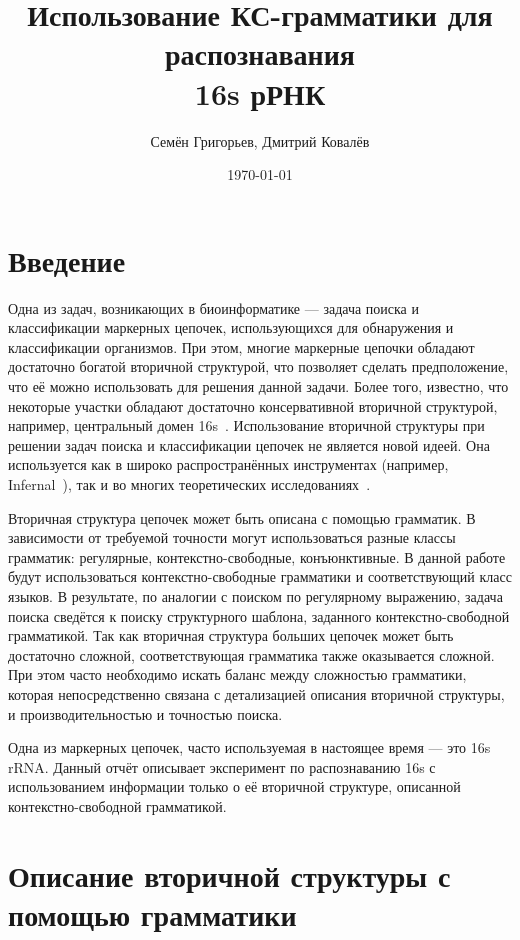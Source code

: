 \documentclass[12pt]{article}  %
\title{Использование КС-грамматики для распознавания \\ 16s рРНК}
\author{Семён Григорьев, Дмитрий Ковалёв}
\date{\today}
\theoremstyle{remark}
\begin{document}

\maketitle 

\section{Введение}

Одна из задач, возникающих в биоинформатике --- задача поиска и классификации маркерных цепочек, использующихся для обнаружения и классификации организмов.
При этом, многие маркерные цепочки обладают достаточно богатой вторичной структурой, что позволяет сделать предположение, что её можно использовать для решения данной задачи.
Более того, известно, что некоторые участки обладают достаточно консервативной вторичной структурой, например, центральный домен 16s~\cite{cons16s}.
Использование вторичной структуры при решении задач поиска и классификации цепочек не является новой идеей.
Она используется как в широко распространённых инструментах (например, Infernal~\cite{Infernal}), так и во многих теоретических исследованиях~\cite{SCFGRNA1,SCFGRNA2, STEMSEARCH1, STEMSEARCH2, SCFGHARD1}.

Вторичная структура цепочек может быть описана с помощью грамматик. 
В зависимости от требуемой точности могут использоваться разные классы грамматик: регулярные, контекстно-свободные, конъюнктивные.
В данной работе будут использоваться контекстно-свободные грамматики и соответствующий класс языков.
В результате, по аналогии с поиском по регулярному выражению, задача поиска сведётся к поиску структурного шаблона, заданного контекстно-свободной грамматикой.
Так как вторичная структура больших цепочек может быть достаточно сложной, соответствующая грамматика также оказывается сложной.
При этом часто необходимо искать баланс между сложностью грамматики, которая непосредственно связана с детализацией описания вторичной структуры, и производительностью и точностью поиска.

Одна из маркерных цепочек, часто используемая в настоящее время --- это 16s rRNA.
Данный отчёт описывает эксперимент по распознаванию 16s с использованием информации только о её вторичной структуре, описанной контекстно-свободной грамматикой.

\section{Описание вторичной структуры с помощью грамматики}
\end{document}
